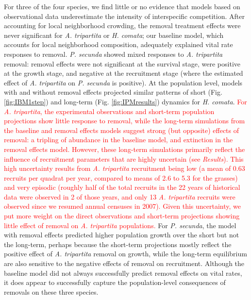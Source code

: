\documentclass[11pt]{article}
\newcommand{\new}{\textcolor{red}}
\begin{document}
\begin{doublespacing}
For three of the four species, we find little or no evidence that models based on observational data underestimate 
the intensity of interspecific competition. After accounting 
for local neighborhood crowding, the removal treatment effects were never significant for \textit{A. tripartita} or \textit{H. comata}; 
our baseline model, which accounts for local neighborhood composition, adequately explained vital rate responses to removal.  
\textit{P. secunda} showed mixed responses to \textit{A. tripartita} removal: removal effects were not significant at the survival stage, 
were positive at the growth stage, and negative at the recruitment stage (where the estimated effect of \textit{A. tripartita} 
on \textit{P. secunda} is positive). At the population level, models with and without removal effects projected similar patterns of 
short (Fig. \ref{fig:IBM1step}) and long-term (Fig. \ref{fig:IPMresults}) dynamics for \textit{H. comata}. \new{ For \textit{A. tripartita}, 
the experimental observations and short-term population projections show little response to removal, while the long-term simulations 
from the baseline and removal effects models suggest strong (but opposite) effects of removal: a tripling of abundance in the baseline model, and extinction in the
removal effects model. However, these long-term simulations primarily reflect the influence of recruitment parameters 
that are highly uncertain (see \emph{Results}). This high uncertainty 
results from \textit{A. tripartita} recruitment being low (a mean of 0.63 recruits per quadrat per year, compared to means of 2.6 to 5.3 for the grasses) and 
very episodic (roughly half of the total recruits in the 22 years of historical data were observed in 2 of those years, and only 13 \textit{A. tripartita} 
recruits were observed since we resumed annual censuses in 2007). Given this uncertainty, we put more weight on the direct observations 
and short-term projections showing little effect of removal on \textit{A. tripartita} populations.}
For \textit{P. secunda}, the model with removal effects predicted higher population growth over the short but not the long-term, perhaps 
because the short-term projections mostly reflect the positive effect of \textit{A. tripartita} removal on growth, while the long-term 
equilibrium are also sensitive to the negative effects of removal on recruitment. Although the baseline model did 
not always successfully predict removal effects on vital rates, it does appear to successfully capture the population-level 
consequences of removals on these three species.


\end{doublespacing}
\end{document}
